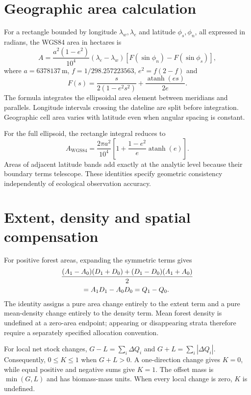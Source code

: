 \documentclass[11pt,a4paper]{article}
\begin{document}
\section{Geographic area calculation}

For a rectangle bounded by longitude $\lambda_w,\lambda_e$ and latitude $\phi_s,\phi_n$, all expressed in radians, the WGS84 area in hectares is
\begin{equation}
A=\frac{a^2(1-e^2)}{10^4}(\lambda_e-\lambda_w)\left[F(\sin\phi_n)-F(\sin\phi_s)\right],
\end{equation}
where $a=6378137$\,m, $f=1/298.257223563$, $e^2=f(2-f)$ and
\[
F(s)=\frac{s}{2(1-e^2s^2)}+\frac{\operatorname{atanh}(es)}{2e}.
\]
The formula integrates the ellipsoidal area element between meridians and parallels. Longitude intervals crossing the dateline are split before integration. Geographic cell area varies with latitude even when angular spacing is constant.

For the full ellipsoid, the rectangle integral reduces to
\[
A_{\mathrm{WGS84}}=\frac{2\pi a^2}{10^4}\left[1+\frac{1-e^2}{e}\operatorname{atanh}(e)\right].
\]
Areas of adjacent latitude bands add exactly at the analytic level because their boundary terms telescope. These identities specify geometric consistency independently of ecological observation accuracy.

\section{Extent, density and spatial compensation}

For positive forest areas, expanding the symmetric terms gives
\begin{align}
&\frac{(A_1-A_0)(D_1+D_0)+(D_1-D_0)(A_1+A_0)}{2}\notag\\
&\hspace{3em}=A_1D_1-A_0D_0=Q_1-Q_0.
\end{align}
The identity assigns a pure area change entirely to the extent term and a pure mean-density change entirely to the density term. Mean forest density is undefined at a zero-area endpoint; appearing or disappearing strata therefore require a separately specified allocation convention.

For local net stock changes, $G-L=\sum_i\Delta Q_i$ and $G+L=\sum_i|\Delta Q_i|$. Consequently, $0\le K\le1$ when $G+L>0$. A one-direction change gives $K=0$, while equal positive and negative sums give $K=1$. The offset mass is $\min(G,L)$ and has biomass-mass units. When every local change is zero, $K$ is undefined.
\end{document}

